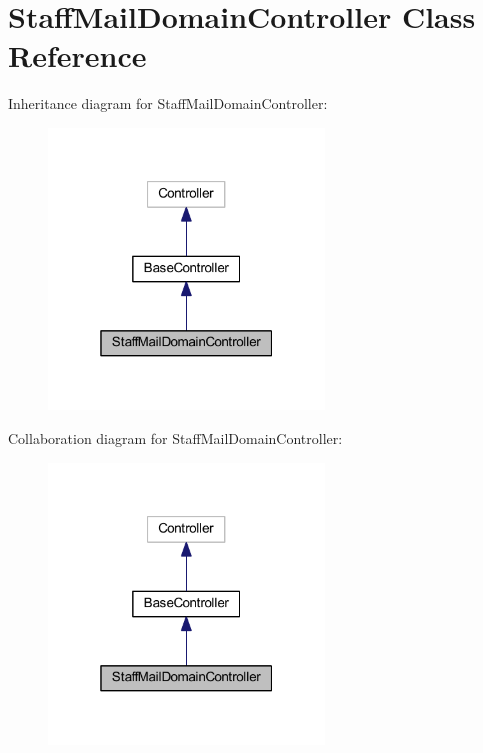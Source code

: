 \hypertarget{class_staff_mail_domain_controller}{}\section{Staff\+Mail\+Domain\+Controller Class Reference}
\label{class_staff_mail_domain_controller}


Inheritance diagram for Staff\+Mail\+Domain\+Controller\+:
\nopagebreak
\begin{figure}[H]
\begin{center}
\leavevmode
\includegraphics[width=208pt]{class_staff_mail_domain_controller__inherit__graph}
\end{center}
\end{figure}


Collaboration diagram for Staff\+Mail\+Domain\+Controller\+:
\nopagebreak
\begin{figure}[H]
\begin{center}
\leavevmode
\includegraphics[width=208pt]{class_staff_mail_domain_controller__coll__graph}
\end{center}
\end{figure}

